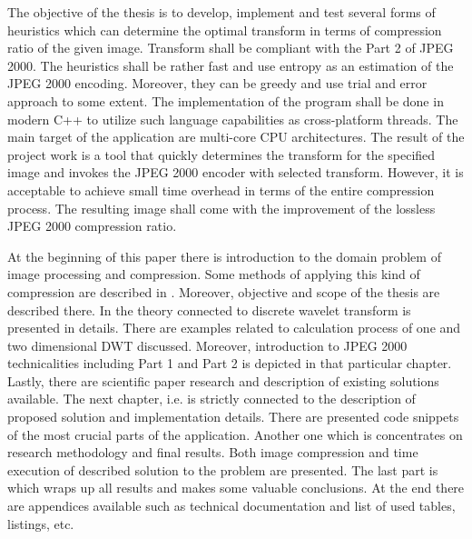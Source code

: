 The objective of the thesis is to develop, implement and test several forms of heuristics which can determine
the optimal transform in terms of compression ratio of the given image. Transform shall be compliant with
the Part 2 of JPEG 2000. The heuristics shall be rather fast and use entropy as an estimation of the JPEG 2000 encoding.
Moreover, they can be greedy and use trial and error approach to some extent. The implementation of the program
shall be done in modern C++ to utilize such language capabilities as cross-platform threads. The main target of the
application are multi-core CPU architectures. The result of the project work is a tool that quickly determines 
the transform for the specified image and invokes the JPEG 2000 encoder with selected transform. However, it is acceptable
to achieve small time overhead in terms of the entire compression process. The resulting image shall come with the
improvement of the lossless JPEG 2000 compression ratio.

At the beginning of this paper there is introduction to the domain problem of image processing and compression.
Some methods of applying this kind of compression are described in . Moreover, objective and scope
of the thesis are described there. In the  theory connected to discrete wavelet transform
is presented in details. There are examples related to calculation process of one and two dimensional DWT discussed.
Moreover, introduction to JPEG 2000 technicalities including Part 1 and Part 2 is depicted in that particular chapter.
Lastly, there are scientific paper research and description of existing solutions available. The next chapter, i.e.
 is strictly connected to the description of proposed solution and implementation details. There are
presented code snippets of the most crucial parts of the application. Another one which is 
concentrates on research methodology and final results. Both image compression and time execution of described
solution to the problem are presented.
The last part is  which wraps up all results and makes some valuable conclusions.
At the end there are appendices available such as technical documentation and list of used tables, listings, etc.
